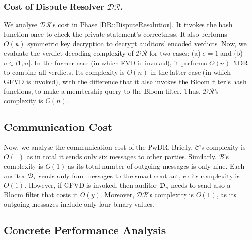 \vspace{-2mm}
\subsubsection{Cost of Dispute Resolver $\mathcal{DR}$.} 
%
We analyse $\mathcal{DR}$'s cost in Phase \ref{DR::DisputeResolution}. It invokes the hash function once to check the private statement's correctness. It also performs $O(n)$ symmetric key decryption to decrypt auditors' encoded verdicts. Now, we evaluate the verdict decoding complexity of $\mathcal{DR}$ 
for two cases: (a) $e = 1$ and (b) $e \in (1, n]$. In the former case (in which  FVD is invoked), it performs $O(n)$ XOR to combine all verdicts. Its complexity is $O(n)$ in the latter case (in which  GFVD is invoked), with the difference that it also invokes the Bloom filter's hash functions, to make a membership query to the Bloom filter.  Thus, $\mathcal{DR}$'s complexity is $O(n)$. 

\vspace{-3mm}

\subsection{Communication Cost} 
\vspace{-1mm}


Now, we analyse the communication cost of the PwDR. Briefly, $\mathcal{C}$'s complexity is $O(1)$ as in total it sends only six messages to other parties. Similarly, $\mathcal{B}$'s complexity is $O(1)$ as its total number of outgoing messages is only nine. Each auditor $\mathcal{D}_{\scriptscriptstyle j}$ sends only four messages to the smart contract, so its complexity is $O(1)$. However, if GFVD is invoked, then auditor $\mathcal{D}_{\scriptscriptstyle n}$ needs to send also a Bloom filter that costs it $O(y)$. Moreover, $\mathcal{DR}$'s complexity is $O(1)$, as its outgoing messages include only four binary values. 




\vspace{-3mm}
\subsection{Concrete Performance Analysis}

\vspace{-.6mm}

